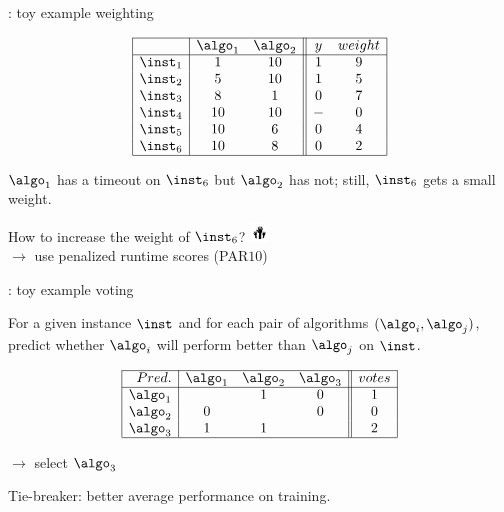 \begin{frame}[c]{: toy example weighting}

\[
\begin{array}{| r | c  c  || c c|}
  \cline{1-5}
      & \algo_1 & \algo_2 & y & weight\\
  \cline{1-5}
  \inst_1 & 		 1    &         10  & 1 & 9 \\
  \inst_2 &          5    &         10  & 1 & 5\\
  \inst_3 &          8    &  		1   & 0 & 7\\
  \inst_4 &         10  &           10  & - & 0\\
  \inst_5 &         10  & 		    6   & 0 & 4\\
  \inst_6 &         10  &           8   & 0 & 2\\
  \cline{1-5}
\end{array}
\]

\bigskip
\pause

$\algo_1$ has a timeout on $\inst_6$ but $\algo_2$ has not; still, $\inst_6$ gets a small weight.

\bigskip
How to increase the weight of $\inst_6$? \includegraphics[height=0.5cm]{images/hands.png}\\
\pause
$\to$ use penalized runtime scores (PAR$10$)

\end{frame}
\begin{frame}[c]{: toy example voting}

For a given instance $\inst$ and for each pair of algorithms $(\algo_i, \algo_j)$, 
predict whether $\algo_i$ will perform better than $\algo_j$ on $\inst$.

\bigskip

\[
\begin{array}{| r | c  c  c || c |}
  \cline{1-5}
   Pred.   & \algo_1 & \algo_2 & \algo_3 & votes\\
  \cline{1-5}
  \algo_1 &      & 1  &  0  & 1\\
  \algo_2 &  0    &   &  0  & 0\\
  \algo_3 &  1    & 1  &    & 2\\
  \cline{1-5}
\end{array}
\]

\pause
\begin{center}
$\to$ select $\algo_3$ 
\end{center}

\bigskip
\pause

Tie-breaker: better average performance on training.

\end{frame}
